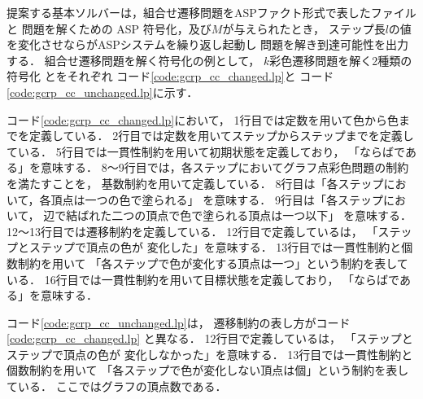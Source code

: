 提案する基本ソルバーは，組合せ遷移問題をASPファクト形式で表したファイルと
問題を解くための ASP 符号化，及び$M$が与えられたとき，
ステップ長$l$の値を変化させならがASPシステムを繰り返し起動し
問題を解き到達可能性を出力する．
組合せ遷移問題を解く符号化の例として，
$k$彩色遷移問題を解く2種類の符号化
とをそれぞれ
コード\ref{code:gcrp_cc_changed.lp}と
コード\ref{code:gcrp_cc_unchanged.lp}に示す．





コード\ref{code:gcrp_cc_changed.lp}において，
1行目では定数を用いて色から色までを定義している．
2行目では定数を用いてステップからステップまでを定義している．
5行目では一貫性制約を用いて初期状態を定義しており，
「ならばである」を意味する．
8～9行目では，各ステップにおいてグラフ点彩色問題の制約を満たすことを，
基数制約を用いて定義している．
8行目は「各ステップにおいて，各頂点は一つの色で塗られる」
を意味する．
9行目は「各ステップにおいて，
辺で結ばれた二つの頂点で色で塗られる頂点は一つ以下」
を意味する．
12～13行目では遷移制約を定義している．
12行目で定義しているは，
「ステップとステップで頂点の色が
変化した」を意味する．
13行目では一貫性制約と個数制約を用いて
「各ステップで色が変化する頂点は一つ」という制約を表している．
16行目では一貫性制約を用いて目標状態を定義しており，
「ならばである」を意味する．

コード\ref{code:gcrp_cc_unchanged.lp}は，
遷移制約の表し方がコード\ref{code:gcrp_cc_changed.lp}
と異なる．
12行目で定義しているは，
「ステップとステップで頂点の色が
変化しなかった」を意味する．
13行目では一貫性制約と個数制約を用いて
「各ステップで色が変化しない頂点は個」という制約を表している．
ここではグラフの頂点数である．

